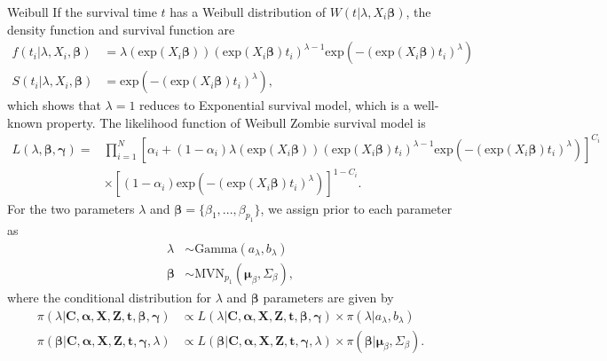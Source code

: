 \documentclass[a4paper, 12pt]{article}
\makeatletter
\renewcommand{\subsection}{\@startsection
	{subsection}    {2}    {0mm}    {-0.5\baselineskip}    {0.01\baselineskip}    {\normalfont\normalsize\itshape\center}}
\makeatother
\begin{document}
\subsection{Weibull}
\noindent 
If the survival time $t$ has a Weibull distribution of $W(t|\lambda, X_i\mathbf{\beta})$, the density function and survival function are
\begin{equation}
\begin{aligned}
f(t_i|\lambda, X_i, \mathbf{\beta}) &= \lambda(\mbox{exp}(X_i\mathbf{\beta})) (\mbox{exp}(X_i\mathbf{\beta})t_i)^{\lambda - 1} \mbox{exp}(-(\mbox{exp}(X_i\mathbf{\beta})t_i)^{\lambda})\\
S(t_i|\lambda, X_i, \mathbf{\beta}) &= \mbox{exp}(-(\mbox{exp}(X_i\mathbf{\beta})t_i)^{\lambda}),
\end{aligned}
\end{equation}
which shows that $\lambda=1$ reduces to Exponential survival model, which is a well-known property. The likelihood function of Weibull Zombie survival model is
\begin{equation}
\begin{aligned}
L(\lambda, \mathbf{\beta}, \mathbf{\gamma})=&\prod\limits_{i=1}^{N}[\alpha _{i}+(1-\alpha _{i})\lambda(\mbox{exp}(X_i\mathbf{\beta})) (\mbox{exp}(X_i\mathbf{\beta})t_i)^{\lambda - 1} \mbox{exp}(-(\mbox{exp}(X_i\mathbf{\beta})t_i)^{\lambda})]^{C_{i}}\\&\times [(1-\alpha _{i})\mbox{exp}(-(\mbox{exp}(X_i\mathbf{\beta})t_i)^{\lambda})]^{1-C_{i}}.
\end{aligned}
\end{equation}
For the two parameters $\lambda$ and $\mathbf{\beta}=\{\beta_1,...,\beta_{p_1}\}$, we assign prior to each parameter as
\begin{equation}
\begin{aligned}
\lambda &\sim \mbox{Gamma}(a_{\lambda}, b_{\lambda})\\
\mathbf{\beta} &\sim \mbox{MVN}_{p_1}(\mathbf{\mu}_{\beta}, \Sigma_{\beta}),
\end{aligned}
\end{equation}
where the conditional distribution for $\lambda$ and $\mathbf{\beta}$ parameters are given by
\begin{equation}
\begin{aligned}
\pi(\lambda|\mathbf{C}, \mathbf{\alpha}, \mathbf{X}, \mathbf{Z}, \mathbf{t}, \mathbf{\beta}, \mathbf{\gamma}) &\propto L(\lambda|\mathbf{C}, \mathbf{\alpha}, \mathbf{X}, \mathbf{Z}, \mathbf{t}, \mathbf{\beta}, \mathbf{\gamma})\times \pi(\lambda|a_{\lambda}, b_{\lambda})\\
\pi(\mathbf{\beta}|\mathbf{C}, \mathbf{\alpha}, \mathbf{X}, \mathbf{Z}, \mathbf{t}, \mathbf{\gamma}, \lambda) &\propto L(\mathbf{\beta}|\mathbf{C}, \mathbf{\alpha}, \mathbf{X}, \mathbf{Z}, \mathbf{t}, \mathbf{\gamma}, \lambda)\times \pi(\mathbf{\beta}|\mathbf{\mu}_{\beta}, \Sigma_{\beta}).
\end{aligned}
\end{equation}
\end{document}
